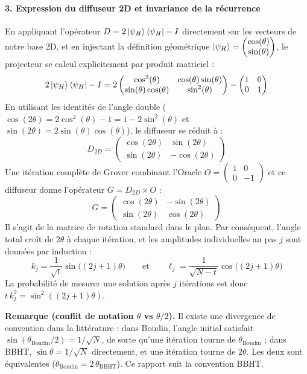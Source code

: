 \documentclass{ceri/sty/rapport}
\begin{document}
\paragraph{3. Expression du diffuseur 2D et invariance de la récurrence}
En appliquant l'opérateur $D = 2\ket{\psi_H}\bra{\psi_H} - I$ directement sur les vecteurs de notre base 2D, et en injectant la définition géométrique $\ket{\psi_H} = \begin{pmatrix} \cos(\theta) \\ \sin(\theta) \end{pmatrix}$, le projecteur se calcul explicitement par produit matriciel :
\[
2\ket{\psi_H}\bra{\psi_H} - I = 2\begin{pmatrix} \cos^2(\theta) & \cos(\theta)\sin(\theta) \\ \sin(\theta)\cos(\theta) & \sin^2(\theta) \end{pmatrix} - \begin{pmatrix} 1 & 0 \\ 0 & 1 \end{pmatrix}
\]
En utilisant les identités de l'angle double ($\cos(2\theta) = 2\cos^2(\theta)-1 = 1-2\sin^2(\theta)$ et $\sin(2\theta) = 2\sin(\theta)\cos(\theta)$), le diffuseur se réduit à :
\[
D_{2D} = \begin{pmatrix} \cos(2\theta) & \sin(2\theta) \\ \sin(2\theta) & -\cos(2\theta) \end{pmatrix}
\]
Une itération complète de Grover combinant l'Oracle $O = \begin{pmatrix} 1 & 0 \\ 0 & -1 \end{pmatrix}$ et ce diffuseur donne l'opérateur $G = D_{2D} \times O$ :
\[
G = \begin{pmatrix} \cos(2\theta) & -\sin(2\theta) \\ \sin(2\theta) & \cos(2\theta) \end{pmatrix}
\]
Il s'agit de la matrice de rotation standard dans le plan. Par conséquent, l'angle total croît de $2\theta$ à chaque itération, et les amplitudes individuelles au pas $j$ sont données par induction :
\[
k_j = \frac{1}{\sqrt{t}}\sin\!\bigl((2j+1)\theta\bigr) \qquad \text{et} \qquad \ell_j = \frac{1}{\sqrt{N-t}}\cos\!\bigl((2j+1)\theta\bigr)
\]
La probabilité de mesurer une solution après $j$ itérations est donc $t\,k_j^2 = \sin^2((2j+1)\theta)$.

\medskip\noindent\textbf{Remarque (conflit de notation $\theta$ vs $\theta/2$).}
Il existe une divergence de convention dans la littérature : dans Boudin, l'angle initial satisfait $\sin(\theta_{\text{Boudin}}/2) = 1/\sqrt{N}$, de sorte qu'une itération tourne de $\theta_{\text{Boudin}}$ ; dans BBHT, $\sin\theta = 1/\sqrt{N}$ directement, et une itération tourne de $2\theta$. Les deux sont équivalentes ($\theta_{\text{Boudin}} = 2\,\theta_{\text{BBHT}}$). Ce rapport suit la convention BBHT.
\end{document}
